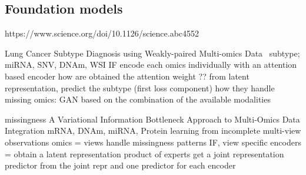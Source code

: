 \documentclass[../main.tex]{subfiles}
\begin{document}
	\subsection{Foundation models}

		https://www.science.org/doi/10.1126/science.abc4552

		Lung Cancer Subtype Diagnosis using Weakly-paired Multi-omics Data~\cite{Wang2022}
		subtype; miRNA, SNV, DNAm, WSI
		IF
		encode each omics individually with an attention based encoder
		how are obtained the attention weight ??
		from latent representation, predict the subtype (first loss component)
		how they handle missing omics: GAN based on the combination of the available modalities

		missingness
		A Variational Information Bottleneck Approach to Multi-Omics Data Integration
		\cite{Lee2021AVI}
		mRNA, DNAm, miRNA, Protein
		learning from incomplete multi-view observations
		omics = views handle missingness patterns
		IF, view specific encoders = obtain a latent representation
		product of experts get a joint representation
		predictor from the joint repr and one predictor for each encoder
\end{document}

